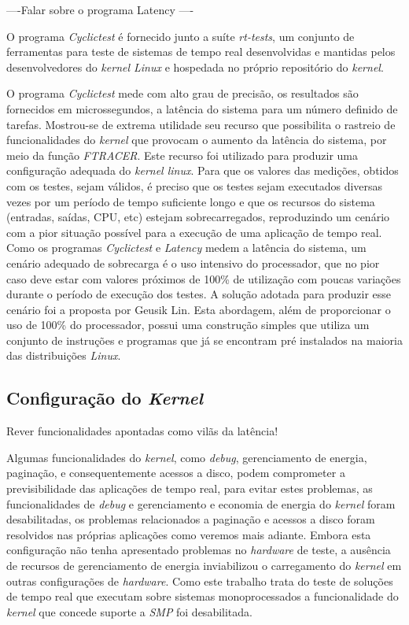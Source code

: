 ----Falar sobre o programa Latency ----

O programa \textit{Cyclictest} é fornecido junto a suíte \textit{rt-tests}, um conjunto de ferramentas para teste de sistemas de tempo real desenvolvidas e mantidas pelos desenvolvedores do \textit{kernel Linux} e hospedada no próprio repositório do \textit{kernel}.

O programa \textit{Cyclictest} mede com alto grau de precisão, os resultados são fornecidos em microssegundos, a latência do sistema para um número definido de tarefas. Mostrou-se de extrema utilidade seu recurso que possibilita o rastreio de funcionalidades do \textit{kernel} que provocam o aumento da latência do sistema, por meio da função \textit{FTRACER}. Este recurso foi utilizado para produzir uma configuração adequada do \textit{kernel linux}.
Para que os valores das medições, obtidos com os testes, sejam válidos, é preciso que os testes sejam executados diversas vezes por um período de tempo suficiente longo e que os recursos do sistema (entradas, saídas, CPU, etc) estejam sobrecarregados, reproduzindo um cenário com a pior situação possível para a execução de uma aplicação de tempo real. Como os programas \textit{Cyclictest} e \textit{Latency} medem a latência do sistema, um cenário adequado de sobrecarga é o uso intensivo do processador, que no pior caso deve estar com valores próximos de 100\% de utilização  com poucas variações durante o período de execução dos testes. A solução adotada para produzir esse cenário foi a proposta por Geusik Lin. Esta abordagem, além de proporcionar o uso de 100\% do processador, possui uma construção simples que utiliza um conjunto de instruções e programas que já se encontram pré instalados na maioria das distribuições \textit{Linux}.

\subsection{Configuração do \textit{Kernel}}  
Rever funcionalidades apontadas como vilãs da latência!

Algumas funcionalidades do \textit{kernel}, como \textit{debug}, gerenciamento de energia, paginação, e consequentemente acessos a disco, podem comprometer a previsibilidade das aplicações de tempo real, para evitar estes problemas, as funcionalidades de \textit{debug} e gerenciamento e economia de energia do \textit{kernel} foram desabilitadas, os problemas relacionados a paginação e acessos a disco foram resolvidos nas próprias aplicações como veremos mais adiante. Embora esta configuração não tenha apresentado problemas no \textit{hardware} de teste, a ausência de recursos de gerenciamento de energia inviabilizou o carregamento do \textit{kernel} em outras configurações de \textit{hardware}. Como este trabalho trata do teste de soluções de tempo real que executam sobre sistemas monoprocessados a funcionalidade do \textit{kernel} que concede suporte a \textit{SMP} foi desabilitada.

